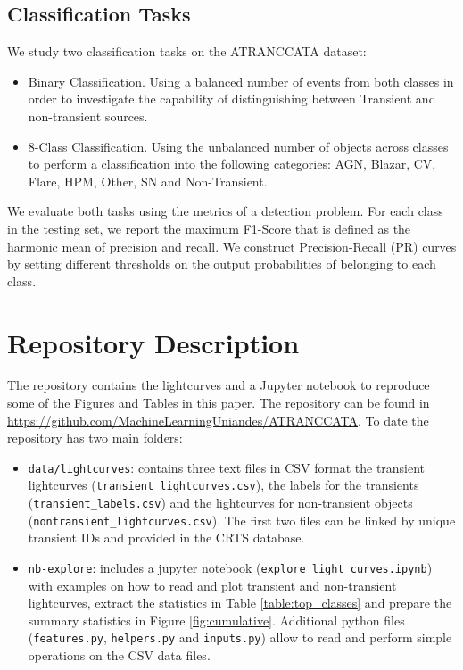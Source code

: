 \documentclass[usenatbib]{mnras}
\begin{document}
\subsection{Classification Tasks} \label{subsection_classification}
We study two classification tasks on the ATRANCCATA dataset: 

\begin{itemize}
\item {Binary Classification}.
Using a balanced number of events from both classes in order 
to investigate the capability of distinguishing between Transient
and non-transient sources.
\item{8-Class Classification}.
Using the unbalanced number of objects across classes to 
perform a classification into the following categories:
AGN, Blazar, CV, Flare, HPM, Other, SN and Non-Transient.
\end{itemize}

We evaluate both tasks using the metrics of a detection problem. 
For each class in the testing set, we report the maximum F1-Score 
that is defined as the harmonic mean of precision and recall. 
We construct Precision-Recall (PR) curves by setting different 
thresholds on the output probabilities of belonging to each class. 


\section{Repository Description} 
\label{sec:repository}

The repository contains the lightcurves and a Jupyter notebook
to reproduce some of the Figures and Tables in this paper.
The repository can be found in \url{https://github.com/MachineLearningUniandes/ATRANCCATA}. 
To date the repository has two main folders:
\begin{itemize}

\item \texttt{data/lightcurves}: 
contains three text files in CSV format
the transient lightcurves (\texttt{transient\_lightcurves.csv}),
the labels for the transients (\texttt{transient\_labels.csv}) and
the lightcurves for non-transient objects
(\texttt{nontransient\_lightcurves.csv}). 
The first two files can be linked by unique transient IDs and
provided in the CRTS database. 
\item \texttt{nb-explore}: includes a jupyter notebook
  (\texttt{explore\_light\_curves.ipynb}) with examples on how to read
  and plot transient and non-transient lightcurves, extract the statistics in Table
  \ref{table:top_classes} and prepare the summary statistics in Figure
  \ref{fig:cumulative}. 
  Additional python files (\texttt{features.py},
  \texttt{helpers.py} and \texttt{inputs.py}) allow to read and perform
  simple operations on the CSV data files. 
\end{itemize}
\end{document}
